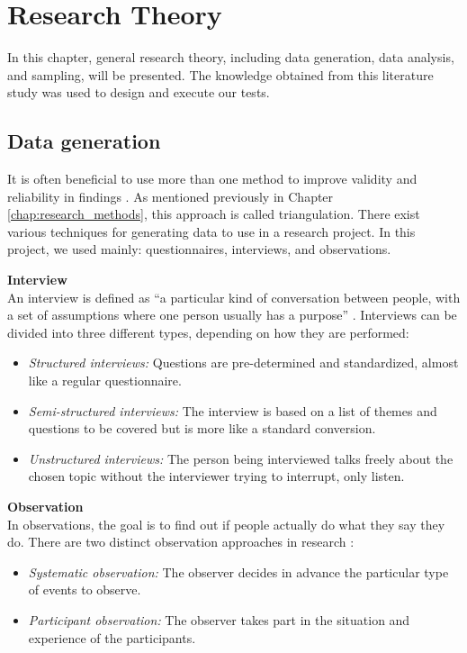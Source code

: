 \section{Research Theory}
\label{chap:research_theory}

In this chapter, general research theory, including data generation, data analysis, and sampling, will be presented. The knowledge obtained from this literature study was used to design and execute our tests. 

\subsection{Data generation}
It is often beneficial to use more than one method to improve validity and reliability in findings \citep{oates_researching_2006}. As mentioned previously in Chapter \ref{chap:research_methods}, this approach is called triangulation. There exist various techniques for generating data to use in a research project. In this project, we used mainly: questionnaires, interviews, and observations.

\textbf{Interview} \\
An interview is defined as “a particular kind of conversation between people, with a set of assumptions where one person usually has a purpose” \citep{oates_researching_2006}. Interviews can be divided into three different types, depending on how they are performed:
\begin{itemize}
    \item \textit{Structured interviews:} Questions are pre-determined and standardized, almost like a regular questionnaire.
    \item \textit{Semi-structured interviews:} The interview is based on a list of themes and questions to be covered but is more like a standard conversion. 
    \item \textit{Unstructured interviews:} The person being interviewed talks freely about the chosen topic without the interviewer trying to interrupt, only listen.
\end{itemize}

\textbf{Observation} \\
In observations, the goal is to find out if people actually do what they say they do. There are two distinct observation approaches in research \citep{oates_researching_2006}:
\begin{itemize}
    \item \textit{Systematic observation:} The observer decides in advance the particular type of events to observe.
    \item \textit{Participant observation:} The observer takes part in the situation and experience of the participants.
\end{itemize}

